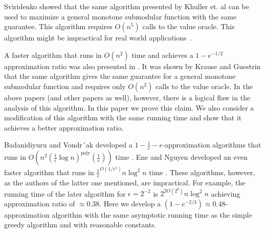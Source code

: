 Sviridenko \cite{sviridenko2004note} showed that the same algorithm presented by
Khuller et. al can be used to maximize a general monotone submodular function
with the same guarantee.
This algorithm requires $O(n^5)$ calls to the value oracle.
This algorithm might be impractical for real world applications~\cite{lin2010multi}.

A faster algorithm that runs in $O(n^2)$ time and achieves a $1 - e^{-1/2}$ approximation ratio
was also presented in \cite{khuller1999budgeted}.
It was shown by Krause and Guestrin \cite{krause2005note} that the same algorithm
gives the same guarantee for a general monotone submodular function and requires only
$O(n^2)$ calls to the value oracle.
In the above papers (and other papers as well), however,
there is a logical flaw in the analysis of this algorithm.
In this paper we prove this claim.
We also consider a modification of this algorithm with the same running time and show that it
achieves a better approximation ratio.

Badanidiyuru and Vondr´ak developed a $1 - \frac{1}{e} - \epsilon$-approximation 
algorithms that runs in 
$O(n^2(\frac{1}{\epsilon}\log n)^\text{poly}(\frac{1}{\epsilon}))$ time 
\cite{badanidiyuru2014fast}.
Ene and Nguyen developed an even faster algorithm that runs in 
$\frac{1}{\epsilon}^{O(1/\epsilon^4)}n \log^2 n$ time
\cite{Alina2017}.
These algorithms, however, 
as the authors of the latter one mentioned, are impractical.
For example, the running time of the later algorithm for $\epsilon = 2^{-2}$ is
$2^{2O(2^{8})}n\log^2n$ achieving approximation ratio of $\approx 0.38$.
Here we develop a $(1 - e^{-2/3}) \approx 0.48$-approximation algorithm with the same
asymptotic running time as the simple greedy algorithm and with reasonable constants.
